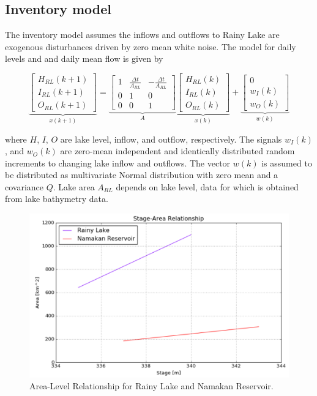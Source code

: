 \documentclass[preprint,times]{elsarticle}
\begin{document}
\subsection{Inventory model}

The inventory model assumes the inflows and outflows to Rainy Lake are exogenous disturbances driven by zero mean white noise. The model for daily levels and and daily mean flow is given by

{\tiny
$$\underbrace{\left[\begin{array}{c} H_{RL}(k+1) \\ I_{RL}(k+1) \\ O_{RL}(k+1) \end{array}\right]}_{x(k+1)} = \underbrace{\left[ \begin{array}{ccc} 1 & \frac{\Delta t}{A_{RL}} & -\frac{\Delta t}{A_{RL}} \\0 & 1 & 0\\0 & 0 &  1\end{array}\right]}_{A} \underbrace{\left[\begin{array}{c} H_{RL}(k) \\ I_{RL}(k) \\ O_{RL}(k) \end{array}\right]}_{x(k)} + \underbrace{\left[ \begin{array}{c} 0 \\ w_{I}(k) \\ w_{O}(k)\end{array}\right]}_{w(k)}$$
}

\noindent
where $H$, $I$, $O$ are lake level, inflow, and outflow, respectively. The signals $w_I(k)$, and $w_O(k)$ are zero-mean independent and identically distributed random increments to changing lake inflow and outflows. The vector $w(k)$ is assumed to be distributed as multivariate Normal distribution with zero mean and a covariance $Q$. Lake area $A_{RL}$ depends on lake level, data for which is obtained from lake bathymetry data.

\begin{figure}
\includegraphics[width=\linewidth]{StageArea}
\caption{Area-Level Relationship for Rainy Lake and Namakan Reservoir.}\label{figure:6}
\end{figure}
\end{document}
